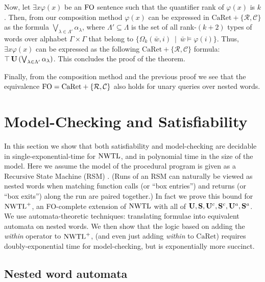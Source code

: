 \documentclass{LMCS}
\newcommand{\w}{{\bar{w}}}
\newcommand{\C}{{\mathcal{C}}}
\newcommand{\R}{{\mathcal{R}}}
\newcommand{\U}{{\mathbf U}}
\renewcommand{\S}{{\mathbf S}}
\newcommand{\FO}{{\rm FO}}
\renewcommand{\phi}{\varphi}
\theoremstyle{plain}
\theoremstyle{definition}
\newcommand{\Sl}{\S}
\newcommand{\Uc}{\U^c}
\newcommand{\Sc}{\S^c}
\newcommand{\Ur}{\U^a}
\newcommand{\Sr}{\S^a}
\newcommand{\caret}{\text{CaRet}}
\newcommand{\nwtlp}{\nwtl^+}
\begin{document}
{Now, let $\exists x \phi(x)$ be an $\FO$ sentence such that the
quantifier rank of $\phi(x)$ is $k$. Then, from our composition method
$\phi(x)$ can be expressed in $\caret+\{\R,\C\}$ as the formula
$\bigvee_{\lambda \in \Lambda'} \alpha_\lambda$, where $\Lambda'
\subseteq \Lambda$ is the set of all rank-$(k+2)$ types of words over
alphabet $\Gamma \times \Gamma$ that belong to $\{\Omega_k(\w,i) \
\mid \ \w \models \phi(i)\}$. Thus, $\exists x \phi(x)$ can be expressed as the
following $\caret+\{\R,\C\}$ formula: $\top \,\Ul \,(\bigvee_{\lambda
\in \Lambda'} \alpha_\lambda)$. This concludes the proof of the
theorem.

Finally, from the composition method and the previous proof we see
that the equivalence $\FO = \caret+\{\R,\C\}$ also holds for unary
queries over nested words.}





\section{Model-Checking and Satisfiability}
\label{mc-sec}

\noindent In this section we show that both satisfiability and model-checking
are decidable in single-exponential-time for $\text{\rm NWTL}$, and
in polynomial time in the size of the model.
Here we assume the model of the procedural
program is given as a Recursive State Machine (RSM) \cite{RSM}.
(Runs of an RSM can naturally be viewed as nested words
 when matching function calls (or ``box entries'') and returns 
 (or ``box exits'') along the run are paired together.) 
In fact we prove this bound
for $\nwtlp$, an \FO-complete extension of $\text{\rm NWTL}$ with all of $\Ul,
\Sl, \Uc, \Sc, \Ur, \Sr$. We use automata-theoretic techniques: 
translating formulae into equivalent automata on nested words. We then
show that the logic based on adding the
{\em within} operator to $\nwtlp$, (and even just adding 
{\em within} to $\caret$) 
 requires doubly-exponential time for
model-checking, but is exponentially more succinct.

\subsection{Nested word automata}
\end{document}

